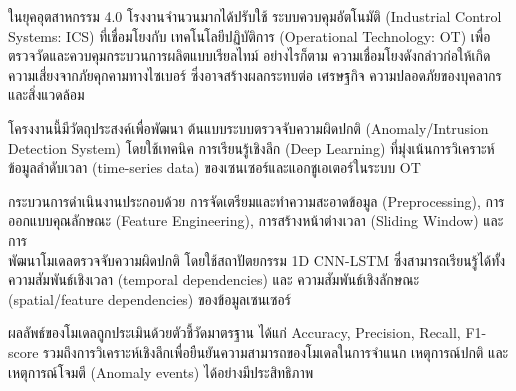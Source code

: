 \maketitle
\makesignature

\ifproject
\begin{abstractTH}
\hspace{2em} ในยุคอุตสาหกรรม 4.0 โรงงานจำนวนมากได้ปรับใช้ ระบบควบคุมอัตโนมัติ (Industrial Control Systems: ICS) ที่เชื่อมโยงกับ เทคโนโลยีปฏิบัติการ (Operational Technology: OT) เพื่อตรวจวัดและควบคุมกระบวนการผลิตแบบเรียลไทม์ อย่างไรก็ตาม ความเชื่อมโยงดังกล่าวก่อให้เกิดความเสี่ยงจากภัยคุกคามทางไซเบอร์ ซึ่งอาจสร้างผลกระทบต่อ เศรษฐกิจ ความปลอดภัยของบุคลากร และสิ่งแวดล้อม

โครงงานนี้มีวัตถุประสงค์เพื่อพัฒนา ต้นแบบระบบตรวจจับความผิดปกติ (Anomaly/Intrusion Detection System) โดยใช้เทคนิค การเรียนรู้เชิงลึก (Deep Learning) ที่มุ่งเน้นการวิเคราะห์ ข้อมูลลำดับเวลา (time-series data) ของเซนเซอร์และแอกชูเอเตอร์ในระบบ OT

กระบวนการดำเนินงานประกอบด้วย การจัดเตรียมและทำความสะอาดข้อมูล (Preprocessing), การออกแบบคุณลักษณะ (Feature Engineering), การสร้างหน้าต่างเวลา (Sliding Window) และการ \\ พัฒนาโมเดลตรวจจับความผิดปกติ โดยใช้สถาปัตยกรรม 1D CNN-LSTM ซึ่งสามารถเรียนรู้ได้ทั้ง ความสัมพันธ์เชิงเวลา (temporal dependencies) และ ความสัมพันธ์เชิงลักษณะ (spatial/feature dependencies) ของข้อมูลเซนเซอร์

ผลลัพธ์ของโมเดลถูกประเมินด้วยตัวชี้วัดมาตรฐาน ได้แก่ Accuracy, Precision, Recall, F1-score รวมถึงการวิเคราะห์เชิงลึกเพื่อยืนยันความสามารถของโมเดลในการจำแนก เหตุการณ์ปกติ และ เหตุการณ์โจมตี (Anomaly events) ได้อย่างมีประสิทธิภาพ

\end{abstractTH}

